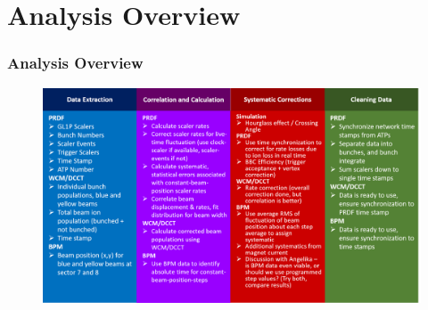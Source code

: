 \section{Analysis Overview}
\label{sec:analysis_overview}

\begin{frame}
  \frametitle{Analysis Overview}
  \begin{figure}
    \includegraphics[width=\linewidth]{"./figures/analysis_map_wide"}
  \end{figure}
\end{frame}
